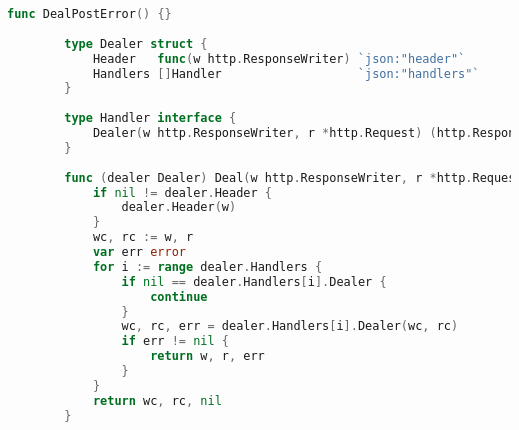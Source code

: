 \documentclass[UTF8]{ctexart}
\begin{document}
\begin{lstlisting}[language=go]
        func DealPostError() {}
        
        type Dealer struct {
            Header   func(w http.ResponseWriter) `json:"header"`
            Handlers []Handler                   `json:"handlers"`
        }
        
        type Handler interface {
            Dealer(w http.ResponseWriter, r *http.Request) (http.ResponseWriter, *http.Request, error)
        }
        
        func (dealer Dealer) Deal(w http.ResponseWriter, r *http.Request) (http.ResponseWriter, *http.Request, error) {
            if nil != dealer.Header {
                dealer.Header(w)
            }
            wc, rc := w, r
            var err error
            for i := range dealer.Handlers {
                if nil == dealer.Handlers[i].Dealer {
                    continue
                }
                wc, rc, err = dealer.Handlers[i].Dealer(wc, rc)
                if err != nil {
                    return w, r, err
                }
            }
            return wc, rc, nil
        }
               
    \end{lstlisting}
\end{document}
